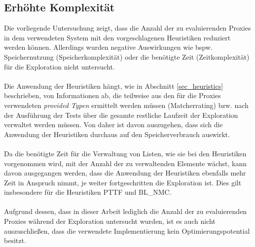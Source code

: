 \subsection{Erhöhte Komplexität}
Die vorliegende Untersuchung zeigt, dass die Anzahl der zu evaluierenden Proxies in dem verwendeten System mit den vorgeschlagenen Heuristiken reduziert werden können. Allerdings wurden negative Auswirkungen wie bspw. Speichernutzung (Speicherkomplexität) oder die benötigte Zeit (Zeitkomplexität) für die Exploration nicht untersucht.
\\\\
Die Anwendung der Heuristiken hängt, wie in Abschnitt \ref{sec_heuristics} beschrieben, von Informationen ab, die teilweise aus den für die Proxies verwendeten \emph{provided Typen} ermittelt werden müssen (Matcherrating) bzw. nach der Ausführung der Tests über die gesamte restliche Laufzeit der Exploration verwaltet werden müssen. Von daher ist davon auszugehen, dass sich die Anwendung der Heuristiken durchaus auf den Speicherverbrauch auswirkt.
\\\\
Da die benötigte Zeit für die Verwaltung von Listen, wie sie bei den Heuristiken vorgenommen wird, mit der Anzahl der zu verwaltenden Elemente wächst, kann davon ausgegangen werden, dass die Anwendung der Heuristiken ebenfalls mehr Zeit in Anspruch nimmt, je weiter fortgeschritten die Exploration ist. Dies gilt insbesondere für die Heuristiken PTTF und BL\_NMC. 
\\\\
Aufgrund dessen, dass in dieser Arbeit lediglich die Anzahl der zu evaluierenden Proxies während der Exploration untersucht wurden, ist es auch nicht auszuschließen, dass die verwendete Implementierung kein Optimierungspotential besitzt.

